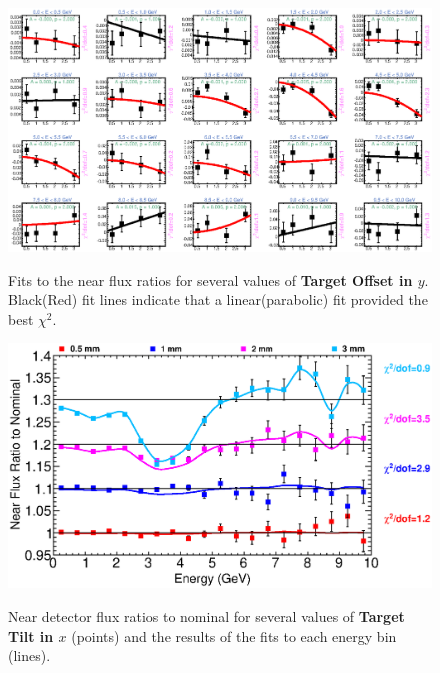 \begin{figure}[ht]
  \begin{center}
    {\includegraphics[width=5.0in]{figures/TargetYOffset_near_fits.eps}}
  \end{center}
\caption{ Fits to the near flux ratios for several values of {\bf Target Offset in $y$}. Black(Red) fit lines indicate that a linear(parabolic) fit provided the best $\chi^2$. }
\end{figure}

\begin{figure}[ht]
  \begin{center}
    {\includegraphics[width=6.0in]{figures/TargetXTilt_near_summary.eps}}
  \end{center}
\caption{ Near detector flux ratios to nominal for several values of {\bf Target Tilt in $x$} (points) and the results of the fits to each energy bin (lines).}
\end{figure}

